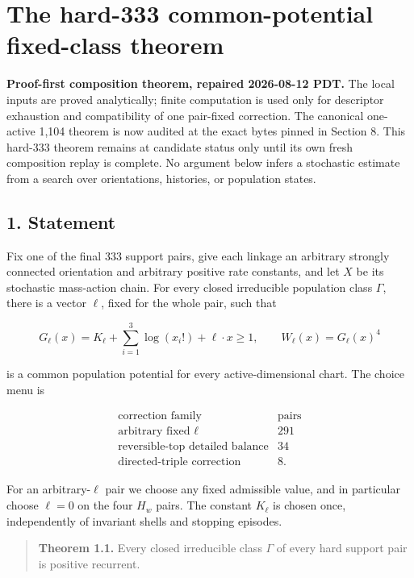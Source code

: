 \section{The hard-333 common-potential fixed-class
theorem}

\textbf{Proof-first composition theorem, repaired 2026-08-12 PDT.} The
local inputs are proved analytically; finite computation is used only
for descriptor exhaustion and compatibility of one pair-fixed
correction. The canonical one-active 1,104 theorem is now audited at the
exact bytes pinned in Section 8. This hard-333 theorem remains at
candidate status only until its own fresh composition replay is
complete. No argument below infers a stochastic estimate from a search
over orientations, histories, or population states.

\subsection{1. Statement}

Fix one of the final 333 support pairs, give each linkage an arbitrary
strongly connected orientation and arbitrary positive rate constants,
and let \(X\) be its stochastic mass-action chain. For every closed
irreducible population class \(\Gamma\), there is a vector \(\ell\),
fixed for the whole pair, such that

\[
 G_\ell(x)=K_\ell+\sum_{i=1}^3\log(x_i!)+\ell\cdot x\ge1,
 \qquad W_\ell(x)=G_\ell(x)^4                         \tag{1.1}
\]

is a common population potential for every active-dimensional chart. The
choice menu is

\[
\begin{array}{c|r}
\text{correction family}&\text{pairs}\\ \hline
\text{arbitrary fixed }\ell&291\\
\text{reversible-top detailed balance}&34\\
\text{directed-triple correction}&8.
\end{array}                                            \tag{1.2}
\]

For an arbitrary-\(\ell\) pair we choose any fixed admissible value, and
in particular choose \(\ell=0\) on the four \(H_w\) pairs. The constant
\(K_\ell\) is chosen once, independently of invariant shells and
stopping episodes.

\begin{quote}
\textbf{Theorem 1.1.} Every closed irreducible class \(\Gamma\) of every
hard support pair is positive recurrent.
\end{quote}

